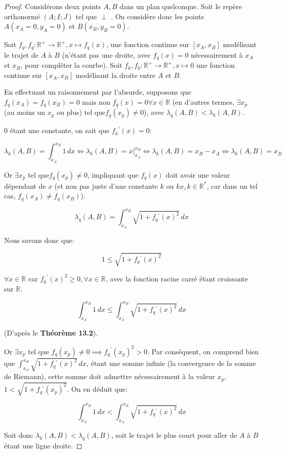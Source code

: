 \documentclass[a4paper]{amsart}
\theoremstyle{definition}
\theoremstyle{remark}
\numberwithin{equation}{section}
\renewcommand*{\overrightarrow}[1]{\vbox{\halign{##\cr 
  \tiny\rightarrowfill\cr\noalign{\nointerlineskip\vskip1pt} 
  $#1\mskip2mu$\cr}}}
\begin{document}
\begin{proof}
  Considérons deux points $A,B$ dans un plan quelconque. Soit le repère orthonormé $(A;I;J)$ tel que \overrightarrow{AJ} $\perp$ \overrightarrow{AB}. On considère donc les points $A(x_A=0,y_A=0)$ et $B(x_B,y_B=0)$.

  Soit $f_q, f_q:\mathbb{R^+}\longrightarrow \mathbb{R^+}, x\longmapsto f_q(x)$, une fonction continue sur $[x_A,x_B]$ modélisant le trajet de $A$ à $B$ (n'étant pas une droite, avec $f_q(x)=0$ nécessairement à $x_A$ et $x_B$, pour compléter la courbe). Soit $f_k, f_k:\mathbb{R^+}\longrightarrow \mathbb{R^+}, x\longmapsto 0$ une fonction
  continue sur $[x_A,x_B]$ modélisant la droite entre $A$ et $B$.

  En effectuant un raisonnement par l'absurde, supposons que $f_q(x_A)=f_q(x_B)=0$ mais non $f_q(x)=0 \forall x\in\mathbb{R}$ (en d'autres termes, $\exists x_p$ (au moins un $x_p$ ou plus) tel que$f_q(x_p)\ne0$), avec $\lambda_q(A,B) < \lambda_k(A,B)$.

  $0$ étant une constante, on sait que ${f_k}^\prime(x)=0$:

  \[\lambda_k(A,B)=\int_{x_A}^{x_B}1 \,dx \Leftrightarrow \lambda_k(A,B)=x\Biggr|_{x_A}^{x_B} \Leftrightarrow \lambda_k(A,B)= x_B-x_A \Leftrightarrow \lambda_k(A,B)= x_B\]

  Or $\exists x_p$ tel que$f_q(x_p)\ne0$, impliquant que $f_q(x)$ doit avoir une valeur dépendant de $x$ (et non pas juste d'une constante $k$ ou $kx, k\in\mathbb{R^*}$, car dans un tel cas, $f_q(x_A)\ne f_q(x_B)$).

  \[\lambda_q(A,B)=\int_{x_A}^{x_B}\sqrt{1+f_q{^\prime}(x)^2} \,dx\]

  Nous savons donc que:

  \[1 \leq \sqrt{1+f_q{^\prime}(x)^2}\]

  $\forall x \in \mathbb{R}$ car $f_q{^\prime}(x)^2\geq 0, \forall x \in \mathbb{R}$, avec la fonction racine carré étant croissante sur $\mathbb{R}$.

  \[\int_{x_A}^{x_B}1 \,dx \leq \int_{x_A}^{x_B}\sqrt{1+f_q{^\prime}(x)^2} \,dx\]

  (D'après le \textbf{Théorème 13.2}).

  Or $\exists x_p$ tel que $f_q(x_p)\ne0 \implies {{f_q}^\prime(x_p)}^2>0$. Par conséquent, on comprend bien que $\int_{x_A}^{x_B}\sqrt{1+f_q{^\prime}(x)^2} \,dx$, étant une somme infinie (la convergence de la somme de Riemann), cette somme doit admettre nécessairement à la valeur $x_p$, $1<\sqrt{1+{f_q{^\prime}(x_p)}^2}$. On en déduit que:

  \[ \int_{x_A}^{x_B}1 \,dx < \int_{x_A}^{x_B}\sqrt{1+f_q{^\prime}(x)^2} \,dx\]

  Soit donc $\lambda_k(A,B) < \lambda_q(A,B)$, soit le trajet le plus court pour aller de $A$ à $B$ étant une ligne droite.
\end{proof}
\end{document}
